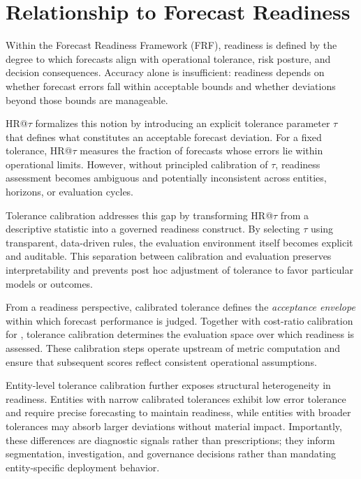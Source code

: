 \section{Relationship to Forecast Readiness}
\label{sec:relationship_to_readiness}

Within the Forecast Readiness Framework (FRF), readiness is defined by the degree
to which forecasts align with operational tolerance, risk posture, and decision
consequences.
Accuracy alone is insufficient: readiness depends on whether forecast errors
fall within acceptable bounds and whether deviations beyond those bounds are
manageable.

HR@$\tau$ formalizes this notion by introducing an explicit tolerance parameter
$\tau$ that defines what constitutes an acceptable forecast deviation.
For a fixed tolerance, HR@$\tau$ measures the fraction of forecasts whose errors
lie within operational limits.
However, without principled calibration of $\tau$, readiness assessment becomes
ambiguous and potentially inconsistent across entities, horizons, or evaluation
cycles.

Tolerance calibration addresses this gap by transforming HR@$\tau$ from a
descriptive statistic into a governed readiness construct.
By selecting $\tau$ using transparent, data-driven rules, the evaluation
environment itself becomes explicit and auditable.
This separation between calibration and evaluation preserves interpretability
and prevents post hoc adjustment of tolerance to favor particular models or
outcomes.

From a readiness perspective, calibrated tolerance defines the \emph{acceptance
envelope} within which forecast performance is judged.
Together with cost-ratio calibration for \CWSL{}, tolerance calibration determines
the evaluation space over which readiness is assessed.
These calibration steps operate upstream of metric computation and ensure that
subsequent scores reflect consistent operational assumptions.

Entity-level tolerance calibration further exposes structural heterogeneity in
readiness.
Entities with narrow calibrated tolerances exhibit low error tolerance and
require precise forecasting to maintain readiness, while entities with broader
tolerances may absorb larger deviations without material impact.
Importantly, these differences are diagnostic signals rather than prescriptions;
they inform segmentation, investigation, and governance decisions rather than
mandating entity-specific deployment behavior.


